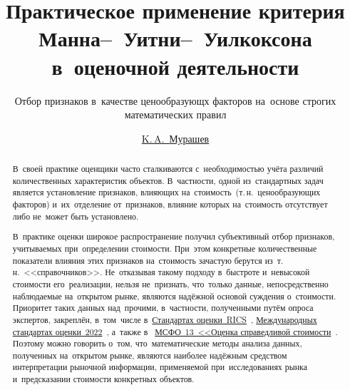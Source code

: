 \documentclass[]{scrreprt}
\title{Практическое применение критерия Манна--~Уитни--~Уилкоксона в~оценочной деятельности}
\subtitle{Отбор признаков в~качестве ценообразующх факторов на~основе строгих математических правил}
\author{\href{https://www.facebook.com/murashev.kirill/}{K.\,A.~{Мурашев}}}
\begin{document}
	
\maketitle
%
%	
\begin{abstract}
	В~своей практике оценщики часто сталкиваются с~необходимостью учёта различий количественных характеристик объектов. В~частности, одной из~стандартных задач является установление признаков, влияющих на~стоимость~(т.\,н.~ценообразующих факторов) и~их~отделение от~признаков, влияние которых на~стоимость отсутствует либо не~может быть установлено.
	
	В~практике оценки широкое распространение получил субъективный отбор признаков, учитываемых при~определении стоимости. При~этом конкретные количественные показатели влияния этих признаков на~стоимость зачастую берутся из~т.\,н.~<<справочников>>. Не~отказывая такому подходу в~быстроте и~невысокой стоимости его~реализации, нельзя не~признать, что~только данные, непосредственно наблюдаемые на~открытом рынке, являются надёжной основой суждения о~стоимости. Приоритет таких данных над~прочими, в~частности, полученными путём опроса экспертов, закреплён, в~том~числе в~\href{https://www.rics.org/uk/upholding-professional-standards/sector-standards/valuation/red-book/red-book-global/}{Стандартах оценки~RICS}~\cite{RVGS-2022}, \href{https://www.rics.org/uk/upholding-professional-standards/sector-standards/valuation/red-book/international-valuation-standards/}{Международных стандартах оценки~2022}~\cite{IVS-2022}, а~также в~ \href{https://normativ.kontur.ru/document?moduleId=1&documentId=326168#l0}{МСФО~13~<<Оценка справедливой стоимости}~\cite{MSFO-13}. Поэтому можно говорить о~том, что~математические методы анализа данных, полученных на~открытом рынке, являются наиболее надёжным средством интерпретации рыночной информации, применяемой при~исследованиях рынка и~предсказании стоимости конкретных объектов.
	

\end{abstract}
\end{document}
